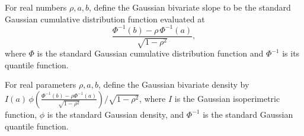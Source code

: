 \begin{definition}
\label{BooleanAnalysis.GaussianSpace.gaussianBivariateSlope}
\leanok
{}
For real numbers $\rho,a,b$, define the Gaussian bivariate slope to be the standard
Gaussian cumulative distribution function evaluated at
\[
\frac{\Phi^{-1}(b)-\rho\,\Phi^{-1}(a)}{\sqrt{1-\rho^2}},
\]
where $\Phi$ is the standard Gaussian cumulative distribution function and $\Phi^{-1}$
is its quantile function.
\end{definition}

\begin{definition}
\label{BooleanAnalysis.GaussianSpace.gaussianBivariateDensity}
\leanok
{}
For real parameters $\rho,a,b$, define the Gaussian bivariate density by
$I(a)\,\phi\!\left(\frac{\Phi^{-1}(b)-\rho\Phi^{-1}(a)}{\sqrt{1-\rho^2}}\right)/\sqrt{1-\rho^2}$,
where $I$ is the Gaussian isoperimetric function, $\phi$ is the standard Gaussian
density, and $\Phi^{-1}$ is the standard Gaussian quantile function.
\end{definition}
